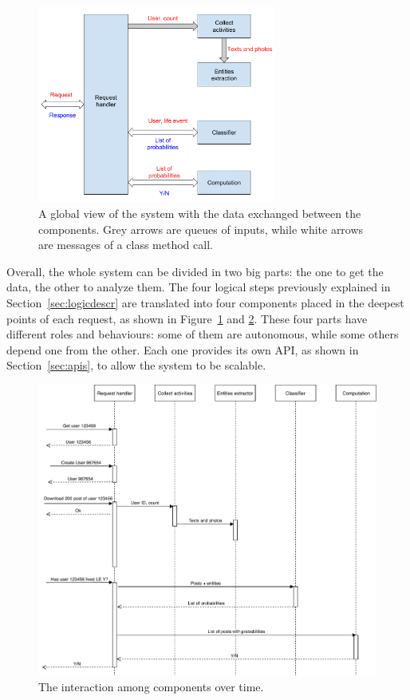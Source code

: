 \begin{figure}
\centering
\includegraphics[width=%
0.7\textwidth]{img/Globalview}
\caption{A global view of the system with the data exchanged between the components. Grey arrows are queues of inputs, while white arrows are messages of a class method call.}
\label{fig:globalview}
\end{figure}

Overall, the whole system can be divided in two big parts: the one to get the data, the other to analyze them. The four logical steps previously explained in Section~\ref{sec:logicdescr} are translated into four components placed in the deepest points of each request, as shown in Figure~\ref{fig:globalview} and \ref{fig:interaction}. These four parts have different roles and behaviours: some of them are autonomous, while some others depend one from the other. Each one provides its own API, as shown in Section~\ref{sec:apis}, to allow the system to be scalable.

\begin{figure}
\centering
\includegraphics[width=%
1\textwidth]{img/Interaction}
\caption{The interaction among components over time.}
\label{fig:interaction}
\end{figure}

